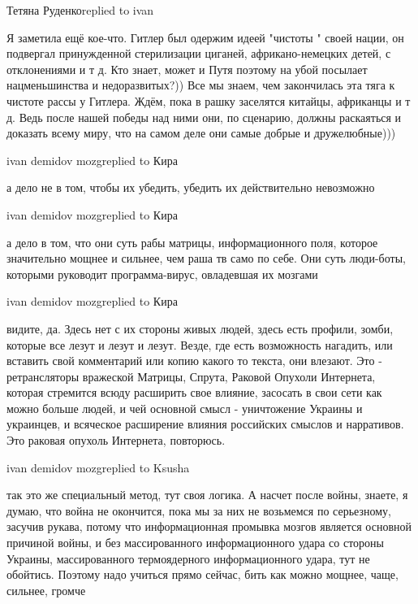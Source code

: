  
 
 
 
 


Тетяна Руденкоreplied to ivan

Я заметила ещё кое-что. Гитлер был одержим идеей "чистоты " своей нации, он
подвергал принужденной стерилизации циганей, африкано-немецких детей, с
отклонениями и т д. Кто знает, может и Путя поэтому на убой посылает
нацменьшинства и недоразвитых?)) Все мы знаем, чем закончилась эта тяга к
чистоте рассы у Гитлера. Ждём, пока в рашку заселятся китайцы, африканцы и т д.
Ведь после нашей победы над ними они, по сценарию, должны раскаяться и доказать
всему миру, что на самом деле они самые добрые и дружелюбные)))

ivan demidov mozgreplied to Кира

а дело не в том, чтобы их убедить, убедить их действительно невозможно

ivan demidov mozgreplied to Кира

а дело в том, что они суть рабы матрицы, информационного поля, которое
значительно мощнее и сильнее, чем раша тв само по себе. Они суть люди-боты,
которыми руководит программа-вирус, овладевшая их мозгами

ivan demidov mozgreplied to Кира

видите, да. Здесь нет с их стороны живых людей, здесь есть профили, зомби,
которые все лезут и лезут и лезут. Везде, где есть возможность нагадить, или
вставить свой комментарий или копию какого то текста, они влезают. Это -
ретрансляторы вражеской Матрицы, Спрута, Раковой Опухоли Интернета, которая
стремится всюду расширить свое влияние, засосать в свои сети как можно больше
людей, и чей основной смысл - уничтожение Украины и украинцев, и всяческое
расширение влияния российских смыслов и нарративов. Это раковая опухоль
Интернета, повторюсь.

ivan demidov mozgreplied to Ksusha

так это же специальный метод, тут своя логика. А насчет после войны, знаете, я
думаю, что война не окончится, пока мы за них не возьмемся по серьезному,
засучив рукава, потому что информационная промывка мозгов является основной
причиной войны, и без массированного информационного удара со стороны Украины,
массированного термоядерного информационного удара, тут не обойтись. Поэтому
надо учиться прямо сейчас, бить как можно мощнее, чаще, сильнее, громче

